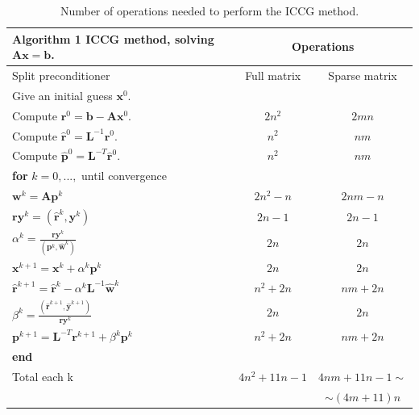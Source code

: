 \documentclass[12pt]{article}
\begin{document}
 \begin{table}[!h]
\begin{tabular}{ |l|c|c| } 
\hline
  \textbf{Algorithm 1} ICCG method, solving $\mathbf{A}\mathbf{x}=\mathbf{b}$.& \multicolumn{2}{c|}{Operations}\\
  \hline
Split preconditioner &Full matrix&Sparse matrix\\
 \hline
Give an initial guess $\mathbf{x}^0$. &&\\
Compute $\mathbf{r}^0=\mathbf{b}-\mathbf{A}\mathbf{x}^0$.&$2n^2$&$2mn$\\
Compute $\hat{\mathbf{r}}^0=\mathbf{L}^{-1}\mathbf{r}^0$.&$n^2$&$nm$\\
Compute $\hat{\mathbf{p}}^0=\mathbf{L}^{-T}\hat{\mathbf{r}}^0$.&$n^2$&$nm$\\
\hline
\hspace{0.5cm}\textbf{for} $k=0,...,$ until convergence&&\\
\hspace{1cm} $\mathbf{w}^k=\mathbf{A}\mathbf{p}^k$&$2n^2-n$&$2nm-n$\\
 \hspace{1cm} $\mathbf{ry}^{k}=(\hat{\mathbf{r}}^{k},\mathbf{y}^{k})$&$2n-1$&$2n-1$\\
 \hspace{1cm} $\alpha^k=\frac{\mathbf{ry}^{k}}{(\mathbf{p}^k,\hat{\mathbf{w}}^k)}$&$2n$&$2n$\\
\hspace{1cm} $\mathbf{x}^{k+1}=\mathbf{x}^k+\alpha^k\mathbf{p}^k$&$2n$&$2n$\\
\hspace{1cm}$\hat{\mathbf{r}}^{k+1}=\hat{\mathbf{r}}^k-\alpha^k\mathbf{L}^{-1}\hat{\mathbf{w}}^k$&$n^2+2n$&$nm+2n$\\
\hspace{1cm}$ \beta^k=\frac{(\hat{\mathbf{r}}^{k+1},\hat{\mathbf{y}}^{k+1})}{\mathbf{ry}^{k}}$&$2n$&$2n$\\
\hspace{1cm}$\mathbf{p}^{k+1}=\mathbf{L}^{-T}\mathbf{r}^{k+1}+\beta^k\mathbf{p}^k$&$n^2+2n$&$nm+2n$\\

\hspace{0.5cm}\textbf{end}&&\\
\hline
Total each k&$4n^2+11n-1$&$4nm+11n-1\sim$\\
&&$\sim (4m+11)n$\\
\hline
\end{tabular}\caption{Number of operations needed to perform the ICCG method.}\label{table:noi}
\end{table}
\end{document}
